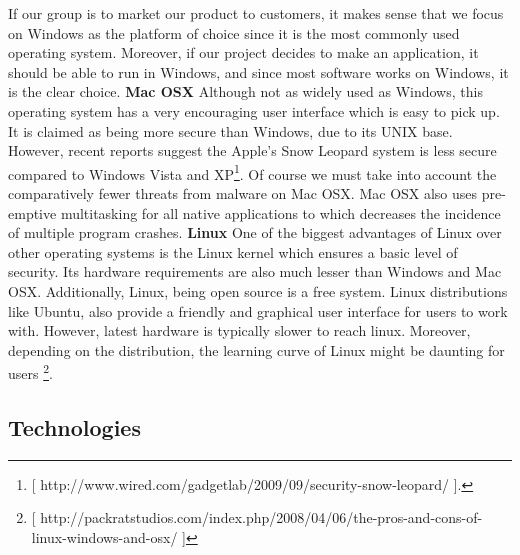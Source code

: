\documentclass[12pt]{article}
\begin{document}
If our group is to market our product to customers, it makes sense that we focus on Windows as the platform of choice since it is the most commonly used operating system. Moreover, if our project decides to make an application, it should be able to run in Windows, and since most software works on Windows, it is the clear choice.
\newline
\newline
\textbf{Mac OSX}
\newline
\newline
Although not as widely used as Windows, this operating system has a very encouraging user interface which is easy to pick up. It is claimed as being more secure than Windows, due to its UNIX base. However, recent reports suggest the Apple’s Snow Leopard system is less secure compared to Windows Vista and XP\footnote{ [ http://www.wired.com/gadgetlab/2009/09/security-snow-leopard/ ].}. Of course we must take into account the comparatively fewer threats from malware on Mac OSX. 
Mac OSX also uses pre-emptive multitasking for all native applications to which decreases the incidence of multiple program crashes.
\newline
\newline
\textbf{Linux}
\newline
\newline
One of the biggest advantages of Linux over other operating systems is the Linux kernel which ensures a basic level of security. Its hardware requirements are also much lesser than Windows and Mac OSX. Additionally, Linux, being open source is a free system. Linux distributions like Ubuntu, also provide a friendly and graphical user interface for users to work with. However, latest hardware is typically slower to reach linux. Moreover, depending on the distribution, the learning curve of Linux might be daunting for users \footnote{[ http://packratstudios.com/index.php/2008/04/06/the-pros-and-cons-of-linux-windows-and-osx/ ]}.

\subsection{Technologies}
\end{document}
